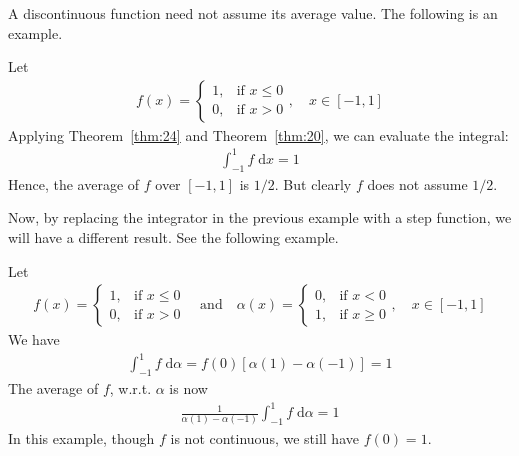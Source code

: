 \documentclass[thmcnt=section, 12pt]{my-elegantbook}
\begin{document}
A discontinuous function need not assume its average value.
The following is an example.

\begin{example} \label{eg:9}
    Let
    \begin{align*}
        f(x) = \begin{cases}
                   1,
                    & \text{if $x \leq 0$} \\
                   0,
                    & \text{if $x > 0$}
               \end{cases},
        \quad
        x \in [-1, 1]
    \end{align*}
    Applying Theorem~\ref{thm:24} and Theorem~\ref{thm:20},
    we can evaluate the integral:
    \begin{align*}
        \int_{-1}^1 f \; \mathrm{d} x = 1
    \end{align*}
    Hence, the average of $f$ over $[-1, 1]$ is $1 / 2$.
    But clearly $f$ does not assume $1/2$.
\end{example}

Now, by replacing the integrator in the previous example
with a step function, we will have a different result.
See the following example.

\begin{example} \label{eg:10}
    Let
    \begin{align*}
        f(x) = \begin{cases}
                   1,
                    & \text{if $x \leq 0$} \\
                   0,
                    & \text{if $x > 0$}
               \end{cases}
        \quad \text{and} \quad
        \alpha(x) = \begin{cases}
                        0,
                         & \text{if $x < 0$}    \\
                        1,
                         & \text{if $x \geq 0$}
                    \end{cases},
        \quad
        x \in [-1, 1]
    \end{align*}
    We have
    \begin{align*}
        \int_{-1}^1 f \; \mathrm{d} \alpha
        = f(0) [\alpha(1) - \alpha(-1)]
        = 1
    \end{align*}
    The average of $f$, w.r.t. $\alpha$ is now
    \begin{align*}
        \frac{1}{ \alpha(1) - \alpha(-1) }
        \int_{-1}^1 f \; \mathrm{d} \alpha
        = 1
    \end{align*}
    In this example, though $f$ is not continuous,
    we still have $f(0) = 1$.
\end{example}
\end{document}

